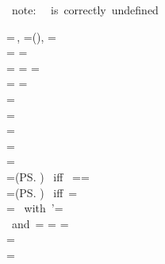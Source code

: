 \begin{MDefinition}{\GuessType\varEnv\e
\quad 
\mbox{ note: }\!\!\GuessType\varEnv{\Cb{\es_\vI\catch_\vI\ldots\es_\vn\catch_\vn}}
\!\mbox{ is correctly undefined}
}

\GuessType\varEnv\classB=\IMdf\,\LibraryKw,\quad
\GuessType\varEnv\x=\varEnv(\x),\quad
\GuessType\varEnv\Path=\TMdf\,\Path\\
\GuessType\varEnv\voidKw=
\GuessType\varEnv{\loopKw\,\e}=
\\\quad
\GuessType\varEnv{\x\, \eqOp\, \e }=
\GuessType\varEnv{\L\, \e}=
\GuessType\varEnv{\ifKw\,\e\,\block_\vI\, \Opt{\elseKw\, \block_\vII}}=
\\\quad
\GuessType\varEnv{\whileKw\, \e \, \block}=
\GuessType\varEnv{\with\,\Opt\block}=
\IMdf\,\VoidKw\\


\GuessType\varEnv{\num\e}=
\GuessType\varEnv{\e\Mc{\pNumberParser}{\Cb{\traitKw}}   }
\\
\GuessType{}
=
\GuessType\varEnv{\e\Mc{\pStringParser}{\Cb{\traitKw}}}\\

\GuessType\varEnv{\unOp\, \e}=
\GuessType\varEnv{\e\Mc{\DesugarChar\unOp}{}}
\\

\GuessType\varEnv{\e_\vI \binOp\, \e_\vII}=
\GuessType\varEnv{\e_\vI\Mc{\DesugarChar\binOp}{\e_\vII}}
\\
\GuessType\varEnv{\e\oRound\ps\cRound}=
\GuessType\varEnv{\e\Mc{\fApply}{\ps}}
\\

\GuessType\varEnv{\e\Mc\m{\ps}}=\T\m\oRound\xsOfPs(\ps)\cRound
\mbox{ iff }
\GuessType\varEnv{\e}=\Path\Many\mx=\T\\
\GuessType\varEnv{\e\Mc\m{\ps}}=\Path\singleDot\m\oRound\xsOfPs(\ps)\cRound
\mbox{ iff }\GuessType\varEnv{\e}=\mdf\,\Path\Opt\preApex\\
\GuessType\varEnv{
\Vd{\es_\vI}{\catch_\vI\ldots\es_\vn\catch_\vn}{\e}
}=
\mbox{ with }\varEnv'=\GuessType\varEnv{\es_\vI\ldots\es_\vn}
\\
\mbox{ and }\GuessType\varEnv{}=\varEnv
\quad
\GuessType\varEnv{\e\,\es}=
\GuessType\varEnv{\C\colon\e\,\es}=\GuessType\varEnv{\es}\\

\quad\quad\GuessType\varEnv{ \Xt{\varOpt}{\x}{\T}{\e}\es}
=\GuessType{\varEnv,\x\mapsto\T}{\es}
\\\quad\quad
\GuessType\varEnv{ \Xt{\varOpt}{\x}{}{\e}\,\es}
=\GuessType{\varEnv,\x\mapsto\GuessType\varEnv{\e}}{\es}
\\




\end{MDefinition}
